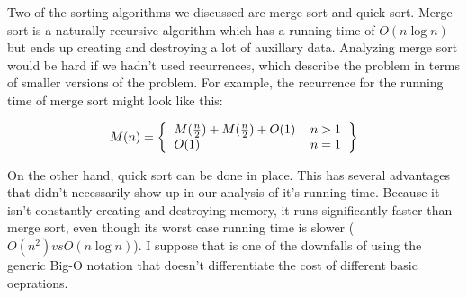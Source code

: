 \documentclass[a4paper,12pt]{article}
\newenvironment{indentpar}[1]%
{\begin{list}{}%
    {\setlength{\leftmargin}{#1}}%
  \item[]%
  }
  {\end{list}}
\begin{document}
\begin{enumerate}[]

\item Two of the sorting algorithms we discussed are merge sort and
  quick sort. Merge sort is a naturally recursive algorithm which has
  a running time of $O(n\log n)$ but ends up creating and destroying a
  lot of auxillary data. Analyzing merge sort would be hard if we
  hadn't used recurrences, which describe the problem in terms of
  smaller versions of the problem. For example, the recurrence for the
  running time of merge sort might look like this:

  \begin{indentpar}{0.5in}

    \[
    M(n) = 
    \left\{
    \begin{tabular}{l r}
      $M(\frac{n}{2}) + M(\frac{n}{2}) + O(1)$ & $n>1$\\
      $O(1)$ & $n=1$
    \end{tabular}
    \right\}
    \]
    
  \end{indentpar}

\item On the other hand, quick sort can be done in place. This has
  several advantages that didn't necessarily show up in our analysis
  of it's running time. Because it isn't constantly creating and
  destroying memory, it runs significantly faster than merge sort,
  even though its worst case running time is slower ($O(n^2) vs
  O(n\log n)$). I suppose that is one of the downfalls of using the
  generic Big-O notation that doesn't differentiate the cost of
  different basic oeprations.

\end{enumerate}
\end{document}
